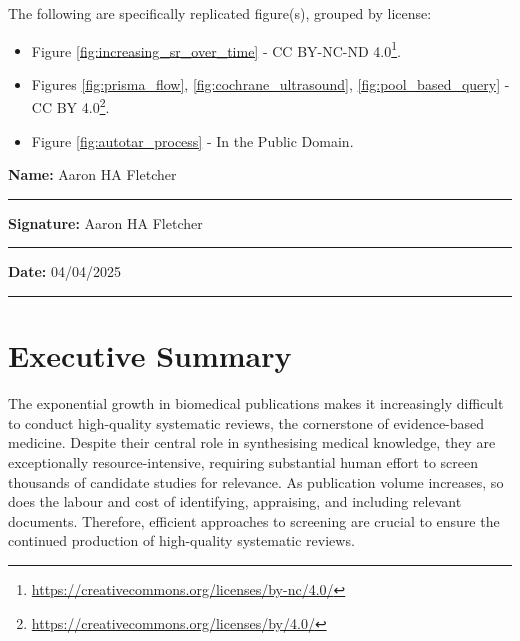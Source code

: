 \documentclass[10pt,oneside]{book}
\begin{document}
The following are specifically replicated figure(s), grouped by license: 

\begin{itemize}
    \item Figure \ref{fig:increasing_sr_over_time} - CC BY-NC-ND 4.0\footnote{\url{https://creativecommons.org/licenses/by-nc/4.0/}}.
    \item Figures \ref{fig:prisma_flow}, \ref{fig:cochrane_ultrasound}, \ref{fig:pool_based_query} - CC BY 4.0\footnote{\url{https://creativecommons.org/licenses/by/4.0/}}.
    \item Figure \ref{fig:autotar_process} - In the Public Domain.
\end{itemize}

\vspace{20em}

\noindent \textbf{Name:} Aaron HA Fletcher\\[1mm]
\rule[1em]{25em}{0.5pt}


\noindent \textbf{Signature:} Aaron HA Fletcher\\[1mm]
\rule[1em]{25em}{0.5pt}


\noindent \textbf{Date:}   04/04/2025\\[1mm]
\rule[1em]{25em}{0.5pt}

\chapter*{Executive Summary}

The exponential growth in biomedical publications makes it increasingly difficult to conduct high-quality systematic reviews, the cornerstone of evidence-based medicine. Despite their central role in synthesising medical knowledge, they are exceptionally resource-intensive, requiring substantial human effort to screen thousands of candidate studies for relevance. As publication volume increases, so does the labour and cost of identifying, appraising, and including relevant documents. Therefore, efficient approaches to screening are crucial to ensure the continued production of high-quality systematic reviews.
\end{document}
